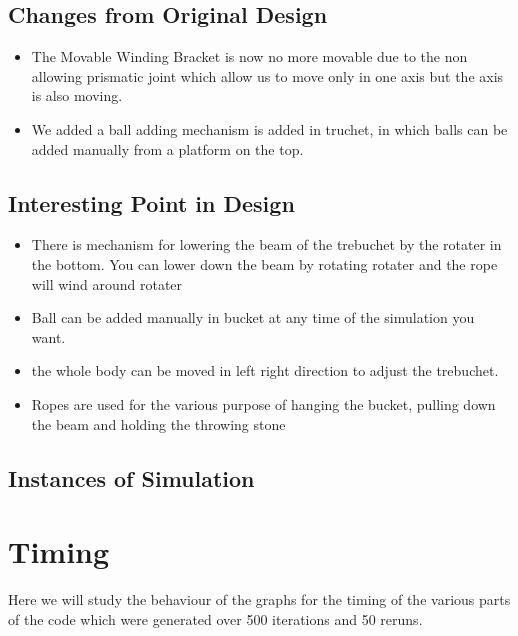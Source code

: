 \documentclass[11pt]{article}
\begin{document}
\subsection{Changes from Original Design}
\begin{itemize}
\item The Movable Winding Bracket is now no more movable due to the non allowing prismatic joint which allow us to move only in one axis but the axis is also moving.
\item We added a ball adding mechanism is added in truchet, in which balls can be added manually from a platform on the top.
\end{itemize}

\subsection{Interesting Point in Design}
\begin{itemize}
\item There is mechanism for lowering the beam of the trebuchet by the rotater in the bottom. You can lower down the beam by rotating rotater and the rope will wind around rotater
\item Ball can be added manually in bucket at any time of the simulation you want.
\item the whole body can be moved in left right direction to adjust the trebuchet.
\item Ropes are used for the various purpose of hanging the bucket, pulling down the beam and holding the throwing stone

\end{itemize}

\subsection{Instances of Simulation}

\section{Timing}
Here we will study the behaviour of the graphs for the timing of the various parts of the code which were generated over 500 iterations and 50 reruns.
\end{document}
